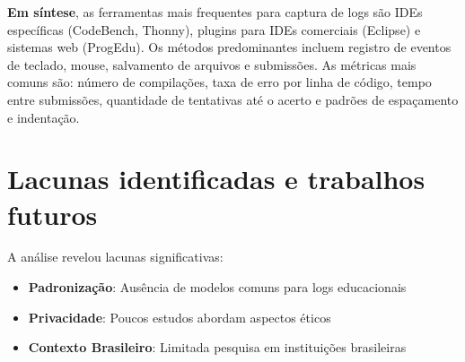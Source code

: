 \noindent \textbf{Em síntese}, as ferramentas mais frequentes para captura de logs são IDEs específicas (CodeBench, Thonny), plugins para IDEs comerciais (Eclipse) e sistemas web (ProgEdu). Os métodos predominantes incluem registro de eventos de teclado, mouse, salvamento de arquivos e submissões. As métricas mais comuns são: número de compilações, taxa de erro por linha de código, tempo entre submissões, quantidade de tentativas até o acerto e padrões de espaçamento e indentação.

\section{Lacunas identificadas e trabalhos futuros}\label{sec:msl-lacunas}

A análise revelou lacunas significativas:
\begin{itemize}
    \item \textbf{Padronização}: Ausência de modelos comuns para logs educacionais
    \item \textbf{Privacidade}: Poucos estudos abordam aspectos éticos
    \item \textbf{Contexto Brasileiro}: Limitada pesquisa em instituições brasileiras
\end{itemize}